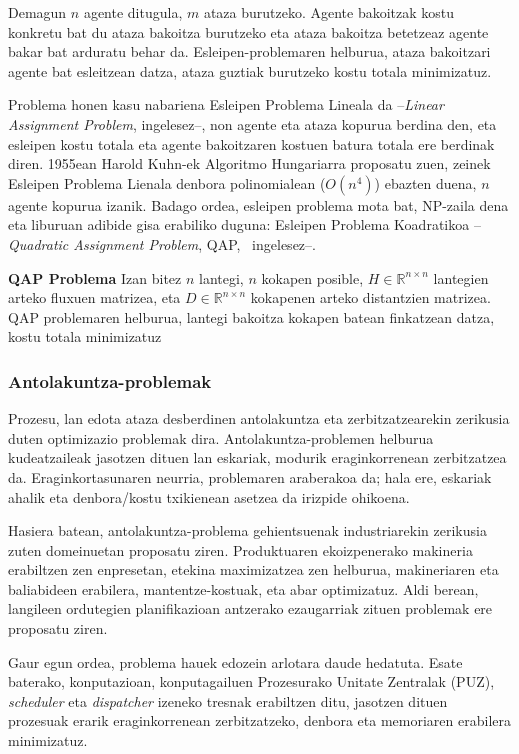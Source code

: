 \documentclass[eu]{ifirak}\usepackage[]{graphicx}\usepackage[]{color}
\begin{document}
Demagun $n$ agente ditugula, $m$ ataza burutzeko. Agente bakoitzak kostu konkretu bat du ataza bakoitza burutzeko eta ataza bakoitza betetzeaz agente bakar bat arduratu behar da.  Esleipen-problemaren helburua, ataza bakoitzari agente bat esleitzean datza, ataza guztiak burutzeko kostu totala minimizatuz.

Problema honen kasu nabariena Esleipen Problema Lineala da --\textit{Linear Assignment Problem}, ingelesez--, non agente eta ataza kopurua berdina den, eta esleipen kostu totala eta agente bakoitzaren kostuen batura totala ere berdinak diren. 1955ean Harold Kuhn-ek Algoritmo Hungariarra proposatu zuen, zeinek Esleipen Problema Lienala denbora polinomialean ($O(n^4)$) ebazten duena, $n$ agente kopurua izanik. Badago ordea, esleipen problema mota bat, NP-zaila dena eta liburuan adibide gisa erabiliko duguna: Esleipen Problema Koadratikoa --\textit{Quadratic Assignment Problem}, QAP,~\cite{burkard1998} ingelesez--.

\begin{ifdefinition} {\bf QAP Problema} Izan bitez $n$ lantegi, $n$ kokapen posible, $H\in\mathbb{R}^{n\times n}$ lantegien arteko fluxuen matrizea, eta $D\in\mathbb{R}^{n\times n}$ kokapenen arteko distantzien matrizea. QAP problemaren helburua, lantegi bakoitza kokapen batean finkatzean datza, kostu totala minimizatuz
\end{ifdefinition}


\subsubsection{Antolakuntza-problemak}

Prozesu, lan edota ataza desberdinen antolakuntza eta zerbitzatzearekin zerikusia duten optimizazio problemak dira. Antolakuntza-problemen helburua kudeatzaileak jasotzen dituen lan eskariak, modurik eraginkorrenean zerbitzatzea da. Eraginkortasunaren neurria, problemaren araberakoa da; hala ere, eskariak ahalik eta denbora/kostu txikienean asetzea da irizpide ohikoena.

Hasiera batean, antolakuntza-problema gehientsuenak industriarekin zerikusia zuten domeinuetan proposatu ziren. Produktuaren ekoizpenerako makineria erabiltzen zen enpresetan, etekina maximizatzea zen helburua, makineriaren eta baliabideen erabilera, mantentze-kostuak, eta abar optimizatuz. Aldi berean, langileen ordutegien planifikazioan antzerako ezaugarriak zituen problemak ere proposatu ziren.

Gaur egun ordea, problema hauek edozein arlotara daude hedatuta. Esate baterako, konputazioan, konputagailuen Prozesurako Unitate Zentralak (PUZ), \textit{scheduler} eta \textit{dispatcher} izeneko tresnak erabiltzen ditu, jasotzen dituen prozesuak erarik eraginkorrenean zerbitzatzeko, denbora eta memoriaren erabilera minimizatuz.
\end{document}
